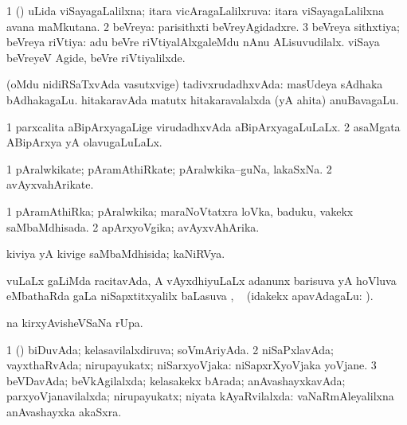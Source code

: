 \bentry
{}
\gl{\gu}
\bmng
\bnum
\num{1} (\pArxparx) uLida viSayagaLalilxna; itara vicAragaLalilxruva:  itara viSayagaLalilxna avana maMkutana. 
\num{2} beVreya:  parisithxti beVreyAgidadxre. 
\num{3} beVreya sithxtiya; beVreya riVtiya:  adu beVre riVtiyalAlxgaleMdu nAnu ALisuvudilalx.  viSaya beVreyeV Agide, beVre riVtiyalilxde. 
\enum
\emng

\noindent
\gl{\pagu}
\bmng
{} (oMdu nidiRSaTxvAda vasutxvige) tadivxrudadhxvAda:  masUdeya sAdhaka bAdhakagaLu.  hitakaravAda matutx hitakaravalalxda (yA ahita) anuBavagaLu. 
\emng
\eentry

\bentry
{}
\gl{\gu}
\bmng
\bnum
\num{1} parxcalita aBipArxyagaLige virudadhxvAda aBipArxyagaLuLaLx. 
\num{2} asaMgata ABipArxya yA olavugaLuLaLx. 
\enum
\emng
\eentry

\bentry
{}
\gl{\nA}
\bmng
\bnum
\num{1} pAralwkikate; pAramAthiRkate; pAralwkika--guNa, lakaSxNa. 
\num{2} avAyxvahArikate. 
\enum
\emng
\eentry

\bentry
{}
\gl{\gu}
\bmng
\bnum
\num{1} pAramAthiRka; pAralwkika; maraNoVtatxra loVka, baduku, \mo vakekx saMbaMdhisada. 
\num{2} apArxyoVgika; avAyxvAhArika. 
\enum
\emng
\eentry

\bentry
{}
\gl{\gu}
\bmng
kiviya yA kivige saMbaMdhisida; kaNiRVya. 
\emng
\eentry

\bentry
{}
\gl{\uparx}
\bmng
{} \uparx vuLaLx \nA gaLiMda racitavAda, A vAyxdhiyuLaLx adanunx barisuva yA hoVluva eMbathaRda \gu gaLa niSapxtitxyalilx baLasuva \uparx, \udA\  (idakekx apavAdagaLu: ). 
\emng
\eentry

\bentry
{}
\gl{\uparx}
\bmng
{}na kirxyAvisheVSaNa rUpa. 
\emng
\eentry

\bentry
{}
\gl{\gu}
\bmng
\bnum
\num{1} (\pArxparx) biDuvAda; kelasavilalxdiruva; soVmAriyAda. 
\num{2} niSaPxlavAda; vayxthaRvAda; nirupayukatx; niSarxyoVjaka:  niSapxrXyoVjaka yoVjane. 
\num{3} beVDavAda; beVkAgilalxda; kelasakekx bArada; anAvashayxkavAda; parxyoVjanavilalxda; nirupayukatx; niyata kAyaRvilalxda:  vaNaRmAleyalilxna anAvashayxka akaSxra. 
\enum
\emng
\eentry

